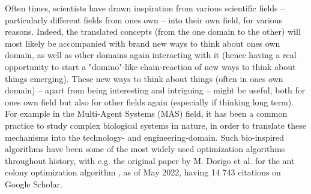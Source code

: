 Often times, scientists have drawn inspiration from various scientific fields -- particularly different fields from ones own -- into their own field, for various reasons. Indeed, the translated concepts (from the one domain to the other) will most likely be accompanied with brand new ways to think about ones own domain, as well as other domains again interacting with it (hence having a real opportunity to start a "domino"-like chain-reaction of new ways to think about things emerging). These new ways to think about things (often in ones own domain) -- apart from being interesting and intriguing -- might be useful, both for ones own field but also for other fields again (especially if thinking long term). For example in the Multi-Agent Systems (MAS) field, it has been a common practice to study complex biological systems in nature, in order to translate these mechanisms into the technology- and engineering-domain. Such bio-inspired algorithms have been some of the most widely used optimization algorithms throughout history, with e.g. the original paper by M. Dorigo et al. for the ant colony optimization algorithm \cite{dorigo_ant_2006}, as of May 2022, having 14 743 citations on Google Scholar.

